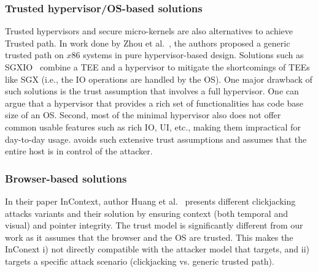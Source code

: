 \subsubsection{\bfseries Trusted hypervisor/OS-based solutions} Trusted hypervisors and secure micro-kernels are also alternatives to achieve Trusted path. In work done by Zhou et al.~\cite{zhou2012building}, the authors proposed a generic trusted path on $x86$ systems in pure hypervisor-based design. Solutions such as SGXIO~\cite{weiser2017sgxio}  combine a TEE and a hypervisor to mitigate the shortcomings of TEEs like SGX (i.e., the IO operations are handled by the OS). One major drawback of such solutions is the trust assumption that involves a full hypervisor. One can argue that a hypervisor that provides a rich set of functionalities has code base size of an OS. Second, most of the minimal hypervisor also does not offer common usable features such as rich IO, UI, etc., making them impractical for day-to-day usage. \name avoids such extensive trust assumptions and assumes that the entire host is in control of the attacker.


\subsubsection{\bfseries Browser-based solutions} In their paper InContext, author Huang et al.~\cite{huang2012clickjacking} presents different clickjacking attacks variants and their solution by ensuring context (both temporal and visual) and pointer integrity. The trust model is significantly different from our work as it assumes that the browser and the OS are trusted. This makes the InConext i) not directly compatible with the attacker model that \name targets, and ii) targets a specific attack scenario (clickjacking vs. generic trusted path).



